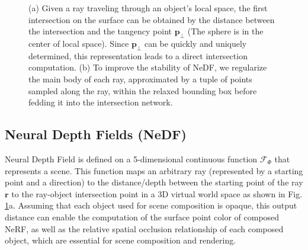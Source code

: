 \documentclass[letterpaper]{article} %
\begin{document}
\begin{figure}[tbp]
  \centering
  \caption{(a) Given a ray traveling through an object's local space, the first intersection on the surface can be obtained by the distance between the intersection and the tangency point $\mathbf{p}_{\perp}$ (The sphere is in the center of local space).
  Since $\mathbf{p}_{\perp}$ can be quickly and uniquely determined, this representation leads to a direct intersection computation. (b) To improve the stability of NeDF, we regularize the main body of each ray, approximated by a tuple of points sampled along the ray, within the relaxed bounding box 
  before fedding it into the intersection network.
  }
  \label{fig:rep_ray}
\end{figure}

\subsection{Neural Depth Fields (NeDF)}
 Neural Depth Field is defined on a 5-dimensional continuous function $\mathcal{F}_{\Phi}$ that represents a scene. This function maps an arbitrary ray (represented by a starting point and a direction) to the distance/depth between the starting point of the ray $\mathbf{r}$ to the ray-object intersection point in a 3D virtual world space as shown in Fig. \ref{fig:rep_ray}a. Assuming that each object used for scene composition is opaque, this output distance can enable the computation of the surface point color of composed NeRF, as well as the relative spatial occlusion relationship of each composed object, which are essential for scene composition and rendering.
\end{document}
